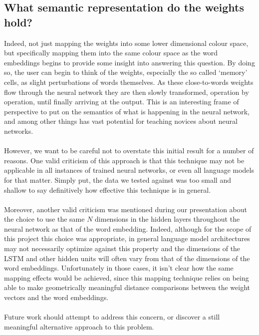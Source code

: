 \documentclass[journal]{vgtc}                %
\begin{document}
\subsection{What semantic representation do the weights hold?}
Indeed, not just mapping the weights into some lower dimensional colour space, but specifically mapping them into the same colour space as the word embeddings begins to provide some insight into answering this question.
By doing so, the user can begin to think of the weights, especially the so called `memory' cells, as slight perturbations of words themselves.
As these close-to-words weights flow through the neural network they are then slowly transformed, operation by operation, until finally arriving at the output.
This is an interesting frame of perspective to put on the semantics of what is happening in the neural network, and among other things has vast potential for teaching novices about neural networks.
\\
\\
However, we want to be careful not to overstate this initial result for a number of reasons.
One valid criticism of this approach is that this technique may not be applicable in all instances of trained neural networks, or even all language models for that matter.
Simply put, the data we tested against was too small and shallow to say definitively how effective this technique is in general.
\\
\\
Moreover, another valid criticism was mentioned during our presentation about the choice to use the same $N$ dimensions in the hidden layers throughout the neural network as that of the word embedding.
Indeed, although for the scope of this project this choice was appropriate, in general language model architectures may not necessarily optimize against this property and the dimensions of the LSTM and other hidden units will often vary from that of the dimensions of the word embeddings.
Unfortunately in those cases, it isn't clear how the same mapping effects would be achieved, since this mapping technique relies on being able to make geometrically meaningful distance comparisons between the weight vectors and the word embeddings.
\\
\\
Future work should attempt to address this concern, or discover a still meaningful alternative approach to this problem.
\end{document}
